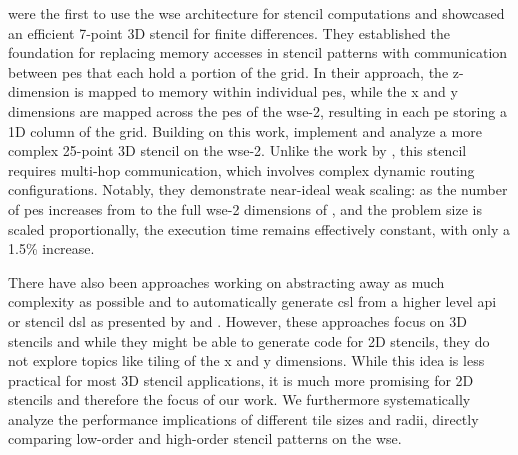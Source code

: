 \citeauthor{rocki2020fast} \cite{rocki2020fast} were the first to use the \ac{wse} architecture for stencil computations and showcased an efficient 7-point 3D stencil for finite differences.
They established the foundation for replacing memory accesses in stencil patterns with communication between \acp{pe} that each hold a portion of the grid. In their approach, the z-dimension is mapped to memory within individual \acp{pe}, while the x and y dimensions are mapped across the \acp{pe} of the \ac{wse}-2, resulting in each \ac{pe} storing a 1D column of the grid.
Building on this work, \citeauthor{jacquelin2022scalable} \cite{jacquelin2022scalable} implement and analyze a more complex 25-point 3D stencil on the \ac{wse}-2. Unlike the work by \citeauthor{rocki2020fast} \cite{rocki2020fast}, this stencil requires multi-hop communication, which involves complex dynamic routing configurations.
Notably, they demonstrate near-ideal weak scaling: as the number of \acp{pe} increases from  to the full \ac{wse}-2 dimensions of , and the problem size is scaled proportionally, the execution time remains effectively constant, with only a 1.5\% increase.

There have also been approaches working on abstracting away as much complexity as possible and to automatically generate \ac{csl} from a higher level \ac{api} or stencil \ac{dsl} as presented by \citeauthor{woo2022disruptive} \cite{woo2022disruptive} and \citeauthor{sai2024automated} \cite{sai2024automated}. However, these approaches focus on 3D stencils and while they might be able to generate code for 2D stencils, they do not explore topics like tiling of the x and y dimensions. While this idea is less practical for most 3D stencil applications, it is much more promising for 2D stencils and therefore the focus of our work. We furthermore systematically analyze the performance implications of different tile sizes and radii, directly comparing low-order and high-order stencil patterns on the \ac{wse}.